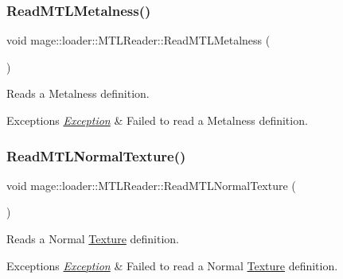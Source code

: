 \subsubsection{\texorpdfstring{Read\+M\+T\+L\+Metalness()}{ReadMTLMetalness()}}
{\footnotesize\ttfamily void mage\+::loader\+::\+M\+T\+L\+Reader\+::\+Read\+M\+T\+L\+Metalness (\begin{DoxyParamCaption}{ }\end{DoxyParamCaption})\hspace{0.3cm}{\ttfamily [private]}}

Reads a Metalness definition.


\begin{DoxyExceptions}{Exceptions}
{\em \hyperlink{classmage_1_1_exception}{Exception}} & Failed to read a Metalness definition. \\
\hline
\end{DoxyExceptions}
\hypertarget{classmage_1_1loader_1_1_m_t_l_reader_a29eef6fe7f430117637b03b8ab12a39e}{}\label{classmage_1_1loader_1_1_m_t_l_reader_a29eef6fe7f430117637b03b8ab12a39e} 
\subsubsection{\texorpdfstring{Read\+M\+T\+L\+Normal\+Texture()}{ReadMTLNormalTexture()}}
{\footnotesize\ttfamily void mage\+::loader\+::\+M\+T\+L\+Reader\+::\+Read\+M\+T\+L\+Normal\+Texture (\begin{DoxyParamCaption}{ }\end{DoxyParamCaption})\hspace{0.3cm}{\ttfamily [private]}}

Reads a Normal \hyperlink{classmage_1_1_texture}{Texture} definition.


\begin{DoxyExceptions}{Exceptions}
{\em \hyperlink{classmage_1_1_exception}{Exception}} & Failed to read a Normal \hyperlink{classmage_1_1_texture}{Texture} definition. \\
\hline
\end{DoxyExceptions}
\hypertarget{classmage_1_1loader_1_1_m_t_l_reader_afdedbcb7b77cf9baf2881b877808ccc0}{}\label{classmage_1_1loader_1_1_m_t_l_reader_afdedbcb7b77cf9baf2881b877808ccc0} 

